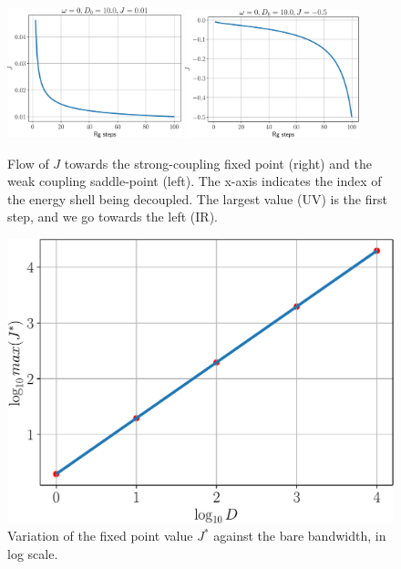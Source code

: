 \begin{figure}[!htb]
	\centering
	\includegraphics[width=0.45\textwidth]{../figures/relJ.pdf}
	\includegraphics[width=0.45\textwidth]{../figures/rel2J.pdf}
	\caption{Flow of \(J\) towards the strong-coupling fixed point (right) and the weak coupling saddle-point (left).  The x-axis indicates the index of the energy shell being decoupled. The largest value (UV) is the first step, and we go towards the left (IR).}
\end{figure}

\begin{figure}[!htb]
	\centering
	\includegraphics[scale=0.4]{../figures/JvsD_kondo.pdf}
	\caption{Variation of the fixed point value \(J^*\) against the bare bandwidth, in log scale.}
	\label{JvsD-kondo}
\end{figure}
